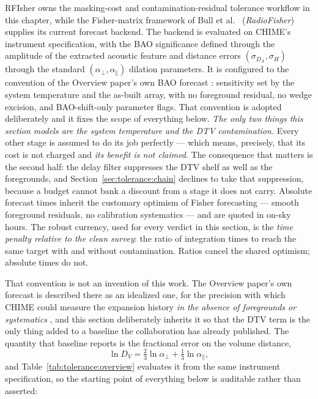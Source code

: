 RFIsher \cite{rfisher-sw} owns the masking-cost and contamination-residual tolerance workflow in this chapter, while the Fisher-matrix framework of Bull et al.\ \cite{bull2015} (\emph{RadioFisher}) supplies its current forecast backend. The backend is evaluated on CHIME's instrument specification, with the BAO significance defined through the amplitude of the extracted acoustic feature and distance errors $(\sigma_{D_A}, \sigma_H)$ through the standard $(\alpha_\perp, \alpha_\parallel)$ dilation parameters. It is configured to the convention of the Overview paper's own BAO forecast \cite{amiri2022chime}: sensitivity set by the system temperature and the as-built array, with no foreground residual, no wedge excision, and BAO-shift-only parameter flags. That convention is adopted deliberately and it fixes the scope of everything below. \emph{The only two things this section models are the system temperature and the DTV contamination.} Every other stage is assumed to do its job perfectly --- which means, precisely, that its cost is not charged and \emph{its benefit is not claimed}. The consequence that matters is the second half: the delay filter suppresses the DTV shelf as well as the foregrounds, and Section~\ref{sec:tolerance:chain} declines to take that suppression, because a budget cannot bank a discount from a stage it does not carry. Absolute forecast times inherit the customary optimism of Fisher forecasting --- smooth foreground residuals, no calibration systematics --- and are quoted in on-sky hours. The robust currency, used for every verdict in this section, is the \emph{time penalty relative to the clean survey}: the ratio of integration times to reach the same target with and without contamination. Ratios cancel the shared optimism; absolute times do not.

That convention is not an invention of this work. The Overview paper's own forecast is described there as an idealized one, for the precision with which CHIME could measure the expansion history \emph{in the absence of foregrounds or systematics} \cite{amiri2022chime}, and this section deliberately inherits it so that the DTV term is the only thing added to a baseline the collaboration has already published. The quantity that baseline reports is the fractional error on the volume distance,
\begin{equation}
\label{eq:tolerance:dv}
\ln D_V = \tfrac{2}{3}\ln\alpha_\perp + \tfrac{1}{3}\ln\alpha_\parallel ,
\end{equation}
and Table~\ref{tab:tolerance:overview} evaluates it from the same instrument specification, so the starting point of everything below is auditable rather than asserted:

